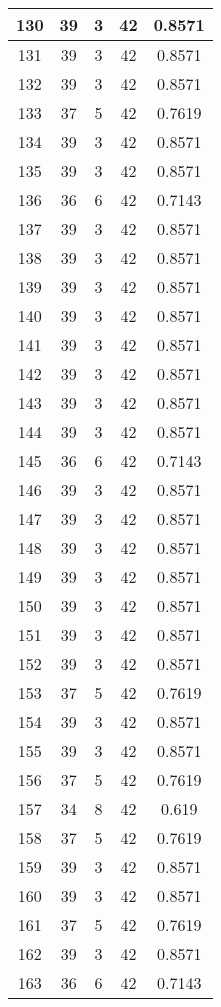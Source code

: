 \documentclass[letterpaper, 12pt]{article}
\begin{document}
\begin{longtable}{|c|c|c|c|c|}
\hline
130 & 39 & 3 & 42 & 0.8571 \\
\hline
131 & 39 & 3 & 42 & 0.8571 \\
\hline
132 & 39 & 3 & 42 & 0.8571 \\
\hline
133 & 37 & 5 & 42 & 0.7619 \\
\hline
134 & 39 & 3 & 42 & 0.8571 \\
\hline
135 & 39 & 3 & 42 & 0.8571 \\
\hline
136 & 36 & 6 & 42 & 0.7143 \\
\hline
137 & 39 & 3 & 42 & 0.8571 \\
\hline
138 & 39 & 3 & 42 & 0.8571 \\
\hline
139 & 39 & 3 & 42 & 0.8571 \\
\hline
140 & 39 & 3 & 42 & 0.8571 \\
\hline
141 & 39 & 3 & 42 & 0.8571 \\
\hline
142 & 39 & 3 & 42 & 0.8571 \\
\hline
143 & 39 & 3 & 42 & 0.8571 \\
\hline
144 & 39 & 3 & 42 & 0.8571 \\
\hline
145 & 36 & 6 & 42 & 0.7143 \\
\hline
146 & 39 & 3 & 42 & 0.8571 \\
\hline
147 & 39 & 3 & 42 & 0.8571 \\
\hline
148 & 39 & 3 & 42 & 0.8571 \\
\hline
149 & 39 & 3 & 42 & 0.8571 \\
\hline
150 & 39 & 3 & 42 & 0.8571 \\
\hline
151 & 39 & 3 & 42 & 0.8571 \\
\hline
152 & 39 & 3 & 42 & 0.8571 \\
\hline
153 & 37 & 5 & 42 & 0.7619 \\
\hline
154 & 39 & 3 & 42 & 0.8571 \\
\hline
155 & 39 & 3 & 42 & 0.8571 \\
\hline
156 & 37 & 5 & 42 & 0.7619 \\
\hline
157 & 34 & 8 & 42 & 0.619 \\
\hline
158 & 37 & 5 & 42 & 0.7619 \\
\hline
159 & 39 & 3 & 42 & 0.8571 \\
\hline
160 & 39 & 3 & 42 & 0.8571 \\
\hline
161 & 37 & 5 & 42 & 0.7619 \\
\hline
162 & 39 & 3 & 42 & 0.8571 \\
\hline
163 & 36 & 6 & 42 & 0.7143 \\

\end{longtable}
\end{document}
